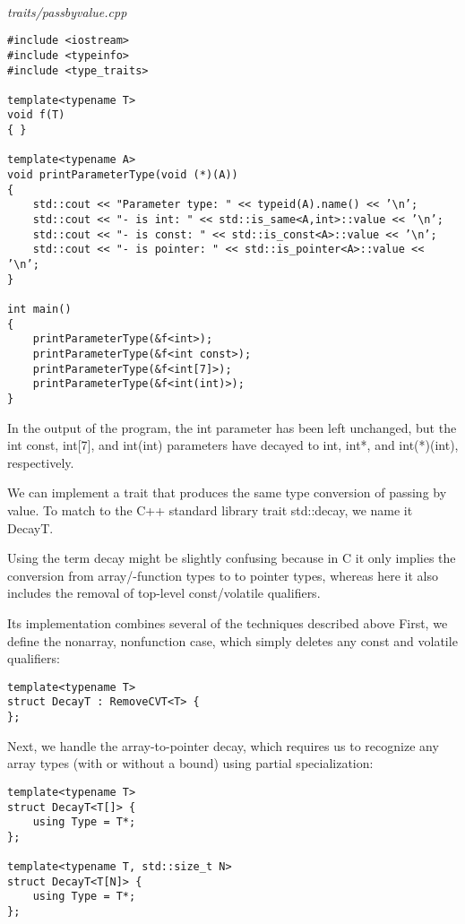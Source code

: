 \hspace*{\fill} \\ %
\noindent
\textit{traits/passbyvalue.cpp}
\begin{lstlisting}[style=styleCXX]
#include <iostream>
#include <typeinfo>
#include <type_traits>

template<typename T>
void f(T)
{ }

template<typename A>
void printParameterType(void (*)(A))
{
	std::cout << "Parameter type: " << typeid(A).name() << ’\n’;
	std::cout << "- is int: " << std::is_same<A,int>::value << ’\n’;
	std::cout << "- is const: " << std::is_const<A>::value << ’\n’;
	std::cout << "- is pointer: " << std::is_pointer<A>::value << ’\n’;
}

int main()
{
	printParameterType(&f<int>);
	printParameterType(&f<int const>);
	printParameterType(&f<int[7]>);
	printParameterType(&f<int(int)>);
}
\end{lstlisting}

In the output of the program, the int parameter has been left unchanged, but the int const, int[7], and int(int) parameters have decayed to int, int*, and int(*)(int), respectively.

We can implement a trait that produces the same type conversion of passing by value. To match to the C++ standard library trait std::decay, we name it DecayT.

\begin{tcolorbox}[colback=webgreen!5!white,colframe=webgreen!75!black]
\hspace*{0.75cm}Using the term decay might be slightly confusing because in C it only implies the conversion from array/-function types to to pointer types, whereas here it also includes the removal of top-level const/volatile qualifiers.
\end{tcolorbox}

Its implementation combines several of the techniques described above First, we define the nonarray, nonfunction case, which simply deletes any const and volatile qualifiers:

\begin{lstlisting}[style=styleCXX]
template<typename T>
struct DecayT : RemoveCVT<T> {
};
\end{lstlisting}

Next, we handle the array-to-pointer decay, which requires us to recognize any array types (with or without a bound) using partial specialization:

\begin{lstlisting}[style=styleCXX]
template<typename T>
struct DecayT<T[]> {
	using Type = T*;
};

template<typename T, std::size_t N>
struct DecayT<T[N]> {
	using Type = T*;
};
\end{lstlisting}

